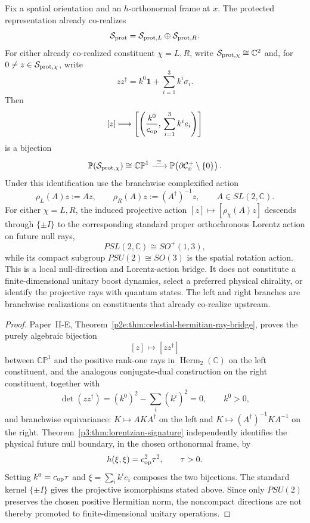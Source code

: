 \documentclass[12pt,a4paper]{article}
\begin{document}
\begin{corollary}
\label{p3:cor:chiral-projective-null-directions}
Fix a spatial orientation and an \(h\)-orthonormal frame at \(x\).  The
protected representation already co-realizes
\[
 \mathcal S_{\rm prot}=\mathcal S_{{\rm prot},L}
 \oplus\mathcal S_{{\rm prot},R}.
\]
For either already co-realized constituent \(\chi=L,R\), write
\(\mathcal S_{{\rm prot},\chi}\cong\mathbb C^2\) and, for
\(0\ne z\in\mathcal S_{{\rm prot},\chi}\), write
\[
        zz^\dagger
        = k^0\mathbf1+\sum_{i=1}^3 k^i\sigma_i .
\]
Then
\[
        [z]\longmapsto
        \left[\left(\frac{k^0}{c_{\rm op}},\,\sum_{i=1}^3k^i e_i\right)\right]
\]
is a bijection
\[
 \mathbb P(\mathcal S_{{\rm prot},\chi})\cong\mathbb{CP}^1
 \xrightarrow{\ \cong\ }
 \mathbb P\!\left(\partial\mathcal C_x^+\setminus\{0\}\right).
\]
Under this identification use the branchwise complexified action
\[
 \rho_L(A)z:=Az,
 \qquad
 \rho_R(A)z:=(A^\dagger)^{-1}z,
 \qquad A\in SL(2,\mathbb C).
\]
For either \(\chi=L,R\), the induced projective action
\([z]\mapsto[\rho_\chi(A)z]\) descends through \(\{\pm I\}\) to the
corresponding standard proper orthochronous Lorentz action on future null rays,
\[
        PSL(2,\mathbb C)\cong SO^+(1,3),
\]
while its compact subgroup
\(PSU(2)\cong SO(3)\) is the spatial rotation action.  This is a local
null-direction and Lorentz-action bridge.  It does not constitute a
finite-dimensional unitary boost dynamics, select a preferred physical
chirality, or identify the projective rays with quantum states.  The left and
right branches are branchwise realizations on constituents that already
co-realize upstream.
\end{corollary}

\begin{proof}
Paper~II-E,
Theorem~\ref{p2e:thm:celestial-hermitian-ray-bridge}, proves the purely
algebraic bijection
\[
        [z]\longmapsto[zz^\dagger]
\]
between \(\mathbb{CP}^1\) and the positive rank-one rays in
\(\operatorname{Herm}_2(\mathbb C)\) on the left constituent, and the
analogous conjugate-dual construction on the right constituent, together with
\[
        \det(zz^\dagger)
        =(k^0)^2-\sum_i(k^i)^2=0,
        \qquad k^0>0,
\]
and branchwise equivariance: \(K\mapsto AKA^\dagger\) on the left and
\(K\mapsto(A^\dagger)^{-1}KA^{-1}\) on the right.
Theorem~\ref{p3:thm:lorentzian-signature} independently identifies the
physical future null boundary, in the chosen orthonormal frame, by
\[
        h(\xi,\xi)=c_{\rm op}^2\tau^2,\qquad \tau>0.
\]
Setting \(k^0=c_{\rm op}\tau\) and
\(\xi=\sum_i k^i e_i\) composes the two
bijections.  The standard kernel \(\{\pm I\}\) gives the projective
isomorphisms stated above.  Since only \(PSU(2)\) preserves the chosen
positive Hermitian norm, the noncompact directions are not thereby promoted
to finite-dimensional unitary operations.
\end{proof}
\end{document}

